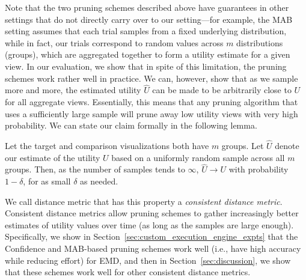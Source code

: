 Note that the two pruning schemes described above have guarantees
in other settings that do not directly carry over to our setting---for example,
the MAB setting assumes that each trial samples from a fixed underlying distribution,
while in fact, our trials correspond to random values across $m$ distributions (groups),
which are aggregated together to form a utility estimate for a given view. 
In our evaluation, we show that in spite of this limitation, the pruning schemes
work rather well in practice. 
We can, however, show that as we sample more and more, the estimated utility
$\hat{U}$ can be made to be arbitrarily close to $U$ for all aggregate views.
Essentially, this means that any pruning algorithm that uses a sufficiently
large sample will prune away low utility views with very high probability.
We can state our claim formally in the following lemma. 
\vspace{-5pt}
\begin{lemma} [Consistency]
Let the target and comparison visualizations
both have $m$ groups.
Let $\hat{U}$ denote our estimate of the utility $U$ 
based on a uniformly random sample 
across all $m$ groups. 
Then, as the number of samples tends to $\infty$, $\hat{U} \rightarrow U$
with probability $1-\delta$, for as small $\delta$ as needed.
\end{lemma}
\vspace{-5pt}
We call distance metric that has this property a {\em
consistent distance metric}.
Consistent distance metrics allow pruning schemes
to gather increasingly better estimates of utility values
over time (as long as the samples are large enough). 
Specifically, we show in Section~\ref{sec:custom_execution_engine_expts}
that the Confidence and MAB-based pruning schemes 
work well (i.e., have high accuracy while reducing
effort) for EMD, and then
in Section~\ref{sec:discussion}, we show that 
these schemes work well for other consistent distance metrics.



